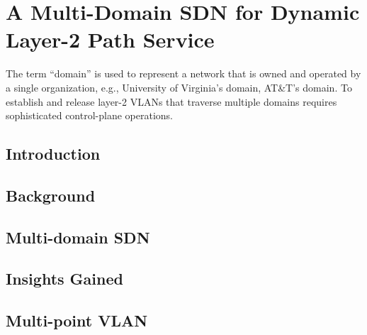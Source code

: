 \chapter{A Multi-Domain SDN for Dynamic Layer-2 Path Service}
\label{sec:DYNES}

The term ``domain'' is used to represent a network that is owned and operated by
a single organization, e.g., University of Virginia's domain, AT\&T's domain.
To establish and release layer-2 VLANs that traverse multiple domains requires sophisticated
control-plane operations.

\section{Introduction}




\section{Background}
\label{sec:control-plane}


\section{Multi-domain SDN}
\label{sec:mdsdn}


\section{Insights Gained}
\label{sec:insights}






\section{Multi-point VLAN}
\label{sec:mdvlan}


